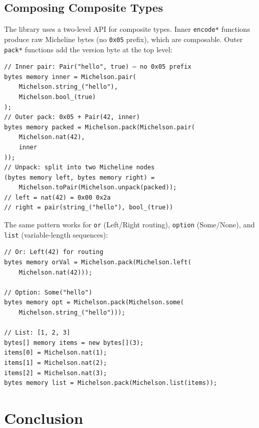\documentclass[11pt,a4paper]{article}
\begin{document}
\subsection{Composing Composite Types}

The library uses a two-level API for composite types. Inner \texttt{encode*}
functions produce raw Micheline bytes (no \texttt{0x05} prefix), which are
composable. Outer \texttt{pack*} functions add the version byte at the top level:

\begin{codebox}
\begin{lstlisting}[language=Solidity]
// Inner pair: Pair("hello", true) — no 0x05 prefix
bytes memory inner = Michelson.pair(
    Michelson.string_("hello"),
    Michelson.bool_(true)
);
// Outer pack: 0x05 + Pair(42, inner)
bytes memory packed = Michelson.pack(Michelson.pair(
    Michelson.nat(42),
    inner
));
// Unpack: split into two Micheline nodes
(bytes memory left, bytes memory right) =
    Michelson.toPair(Michelson.unpack(packed));
// left = nat(42) = 0x00 0x2a
// right = pair(string_("hello"), bool_(true))
\end{lstlisting}
\end{codebox}

The same pattern works for \texttt{or} (Left/Right routing), \texttt{option}
(Some/None), and \texttt{list} (variable-length sequences):

\begin{codebox}
\begin{lstlisting}[language=Solidity]
// Or: Left(42) for routing
bytes memory orVal = Michelson.pack(Michelson.left(
    Michelson.nat(42)));

// Option: Some("hello")
bytes memory opt = Michelson.pack(Michelson.some(
    Michelson.string_("hello")));

// List: [1, 2, 3]
bytes[] memory items = new bytes[](3);
items[0] = Michelson.nat(1);
items[1] = Michelson.nat(2);
items[2] = Michelson.nat(3);
bytes memory list = Michelson.pack(Michelson.list(items));
\end{lstlisting}
\end{codebox}

\section{Conclusion}
\end{document}
